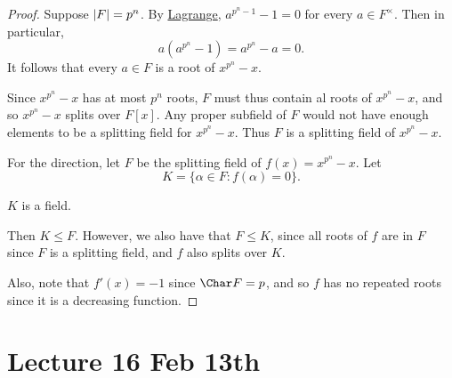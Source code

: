 \documentclass[notoc,notitlepage,nobib]{tufte-book}
\begin{document}
\begin{proof}
  Suppose $\left|F\right| = p^n$. By \hyperref[thm:lagrange_s_theorem]{Lagrange}, $a^{p^n - 1} - 1 = 0$ for every $a \in F^\times$. Then in particular,
  \begin{equation*}
    a(a^{p^n} - 1) = a^{p^n} - a = 0.
  \end{equation*}
  It follows that every $a \in F$ is a root of $x^{p^n} - x$.

  Since $x^{p^n} - x$ has at most $p^n$ roots, $F$ must thus contain al roots of $x^{p^n}
  - x$, and so $x^{p^n} - x$ splits over $F[x]$. Any proper subfield of $F$ would not have
  enough elements to be a splitting field for $x^{p^n} - x$. Thus $F$ is a splitting field
  of $x^{p^n} - x$.

  For the \hlbnoted{$\impliedby$} direction, let $F$ be the splitting field of $f(x) =
  x^{p^n} - x$. Let
  \begin{equation*}
    K = \{ \alpha \in F : f(\alpha) = 0 \}.
  \end{equation*}
  \begin{ex}
    $K$ is a field.
  \end{ex}

  Then $K \leq F$. However, we also have that $F \leq K$, since all roots of $f$ are in
  $F$ since $F$ is a splitting field, and $f$ also splits over $K$.

  Also, note that $f'(x) = -1$ since $\Char F = p$, and so $f$ has no repeated roots since
  it is a decreasing function.
\end{proof}



\chapter{Lecture 16 Feb 13th}%
\label{chp:lecture_16_feb_13th}
\end{document}
